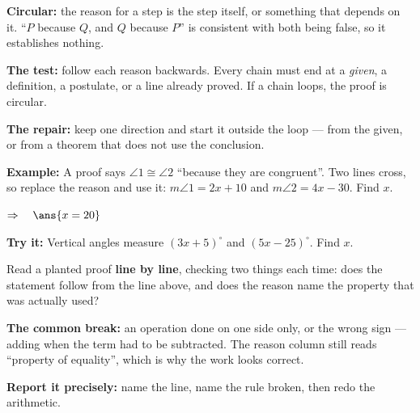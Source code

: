 \documentclass[12pt]{article}
\begin{document}


\begin{formulabox}
\textbf{Circular:} the reason for a step is the step itself, or something that depends on it. ``$P$ because $Q$, and $Q$ because $P$'' is consistent with both being false, so it establishes nothing.\par
\textbf{The test:} follow each reason backwards. Every chain must end at a \emph{given}, a definition, a postulate, or a line already proved. If a chain loops, the proof is circular.\par
\textbf{The repair:} keep one direction and start it outside the loop --- from the given, or from a theorem that does not use the conclusion.
\end{formulabox}

\begin{examplebox}
\textbf{Example:} \quad A proof says $\angle 1 \cong \angle 2$ ``because they are congruent''. Two lines cross, so replace the reason and use it: $m\angle 1 = 2x + 10$ and $m\angle 2 = 4x - 30$. Find $x$.

$\Rightarrow\quad \ans{x = 20}$
\end{examplebox}

\begin{tryitbox}
\textbf{Try it:} \quad Vertical angles measure $(3x + 5)^\circ$ and $(5x - 25)^\circ$. Find $x$.\\[2pt]
\end{tryitbox}


\begin{formulabox}
Read a planted proof \textbf{line by line}, checking two things each time: does the statement follow from the line above, and does the reason name the property that was actually used?\par
\textbf{The common break:} an operation done on one side only, or the wrong sign --- adding when the term had to be subtracted. The reason column still reads ``property of equality'', which is why the work looks correct.\par
\textbf{Report it precisely:} name the line, name the rule broken, then redo the arithmetic.
\end{formulabox}
\end{document}
